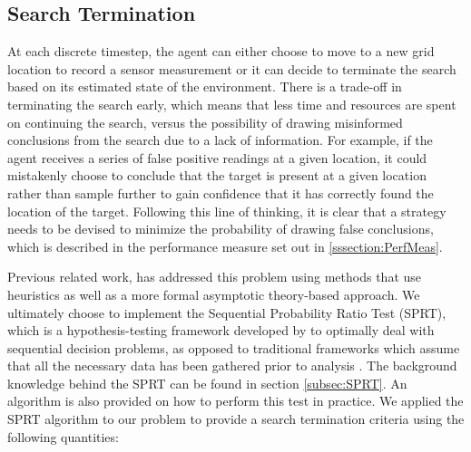 
\subsection{Search Termination}\label{subsubsec:SeachTerminationMethodology}
\workinprogress

At each discrete timestep, the agent can either choose to move to a new grid location to record a sensor measurement or it can decide to terminate the search based on its estimated state of the environment. There is a trade-off in terminating the search early, which means that less time and resources are spent on continuing the search, versus the possibility of drawing misinformed conclusions from the search due to a lack of information. For example, if the agent receives a series of false positive readings at a given location, it could mistakenly choose to conclude that the target is present at a given location rather than sample further to gain confidence that it has correctly found the location of the target. Following this line of thinking, it is clear that a strategy needs to be devised to minimize the probability of drawing false conclusions, which is described in the performance measure set out in \ref{sssection:PerfMeas}.\par
Previous related work, \cite{Chung2007ASearchb} has addressed this problem using methods that use heuristics as well as a more formal asymptotic theory-based approach. We ultimately choose to implement the Sequential Probability Ratio Test (SPRT), which is a hypothesis-testing framework developed by \citeauthor{Wald1950BayesProblems} to optimally deal with sequential decision problems, as opposed to traditional frameworks which assume that all the necessary data has been gathered prior to analysis \cite{Wald1950BayesProblems}. The background knowledge behind the SPRT can be found in section \ref{subsec:SPRT}. An algorithm is also provided on how to perform this test in practice.
We applied the SPRT algorithm to our problem to provide a search termination criteria using the following quantities: 

